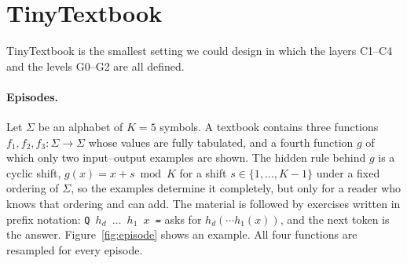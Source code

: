 \documentclass[11pt]{article}
\newcommand{\tok}[1]{\texttt{#1}}
\begin{document}
\section{TinyTextbook}
\label{sec:benchmark}

TinyTextbook is the smallest setting we could design in which the layers C1--C4 and the levels G0--G2 are all defined.

\paragraph{Episodes.}
Let $\Sigma$ be an alphabet of $K=5$ symbols.
A textbook contains three functions $f_1, f_2, f_3 : \Sigma \to \Sigma$ whose values are fully tabulated, and a fourth function $g$ of which only two input--output examples are shown.
The hidden rule behind $g$ is a cyclic shift, $g(x) = x + s \bmod K$ for a shift $s \in \{1,\dots,K-1\}$ under a fixed ordering of $\Sigma$, so the examples determine it completely, but only for a reader who knows that ordering and can add.
The material is followed by exercises written in prefix notation: \tok{Q $h_d$ $\ldots$ $h_1$ $x$ =} asks for $h_d(\cdots h_1(x))$, and the next token is the answer.
Figure~\ref{fig:episode} shows an example.
All four functions are resampled for every episode.
\end{document}
